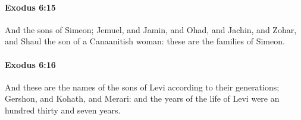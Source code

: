 		\paragraph{Exodus 6:15} %
			\label{EXODUS-6-15}

			And the sons of Simeon; Jemuel, and Jamin, and Ohad, and Jachin, and Zohar, and Shaul the son of a Canaanitish woman: these are the families of Simeon.


		\paragraph{Exodus 6:16} %
			\label{EXODUS-6-16}

			And these are the names of the sons of Levi according to their generations; Gershon, and Kohath, and Merari: and the years of the life of Levi were an hundred thirty and seven years.


